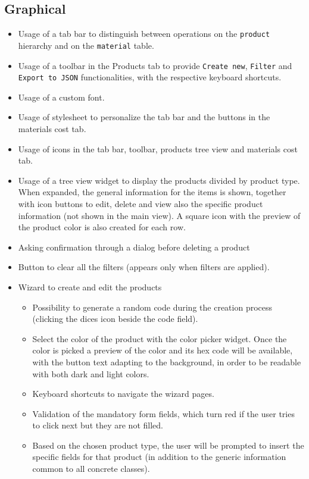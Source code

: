 \documentclass[10pt]{article}
\begin{document}
\subsection{Graphical}
\begin{itemize}
    \item Usage of a tab bar to distinguish between operations on the \texttt{product}
          hierarchy and on the \texttt{material} table.
    \item Usage of a toolbar in the Products tab to provide \texttt{Create new},
          \texttt{Filter} and \texttt{Export to JSON} functionalities, with the
          respective keyboard shortcuts.
    \item Usage of a custom font.
    \item Usage of stylesheet to personalize the tab bar and the buttons in the materials
          cost tab.
    \item Usage of icons in the tab bar, toolbar, products tree view and materials cost
          tab.
    \item Usage of a tree view widget to display the products divided by product type.
          When expanded, the general information for the items is shown, together with
          icon buttons to edit, delete and view also the specific product information
          (not shown in the main view). A square icon with the preview of the product
          color is also created for each row.
    \item Asking confirmation through a dialog before deleting a product
    \item Button to clear all the filters (appears only when filters are applied).
    \item Wizard to create and edit the products
          \begin{itemize}
              \item Possibility to generate a random code during the creation process (clicking the
                    dices icon beside the code field).
              \item Select the color of the product with the color picker widget. Once the color is
                    picked a preview of the color and its hex code will be available, with the
                    button text adapting to the background, in order to be readable with both dark
                    and light colors.
              \item Keyboard shortcuts to navigate the wizard pages.
              \item Validation of the mandatory form fields, which turn red if the user tries to
                    click next but they are not filled.
              \item Based on the chosen product type, the user will be prompted to insert the
                    specific fields for that product (in addition to the generic information common
                    to all concrete classes).
          \end{itemize}

\end{itemize}
\newpage
\end{document}
